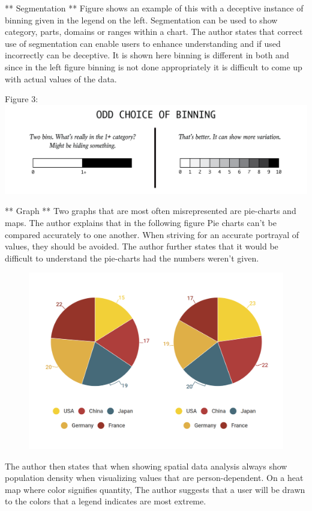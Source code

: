 \documentclass[]{book}
\theoremstyle{definition}
\theoremstyle{definition}
\theoremstyle{definition}
\theoremstyle{remark}
\begin{document}
** Segmentation ** Figure shows an example of this with a deceptive
instance of binning given in the legend on the left. Segmentation can be
used to show category, parts, domains or ranges within a chart. The
author states that correct use of segmentation can enable users to
enhance understanding and if used incorrectly can be deceptive. It is
shown here binning is different in both and since in the left figure
binning is not done appropriately it is difficult to come up with actual
values of the data.

Figure 3: \includegraphics{images/Segmentation 1.png}

** Graph ** Two graphs that are most often misrepresented are pie-charts
and maps. The author explains that in the following figure Pie charts
can't be compared accurately to one another. When striving for an
accurate portrayal of values, they should be avoided. The author further
states that it would be difficult to understand the pie-charts had the
numbers weren't given.

\begin{figure}
\centering
\includegraphics{images/PieCharts.png}
\caption{}
\end{figure}

The author then states that when showing spatial data analysis always
show population density when visualizing values that are
person-dependent. On a heat map where color signifies quantity, The
author suggests that a user will be drawn to the colors that a legend
indicates are most extreme.
\end{document}
